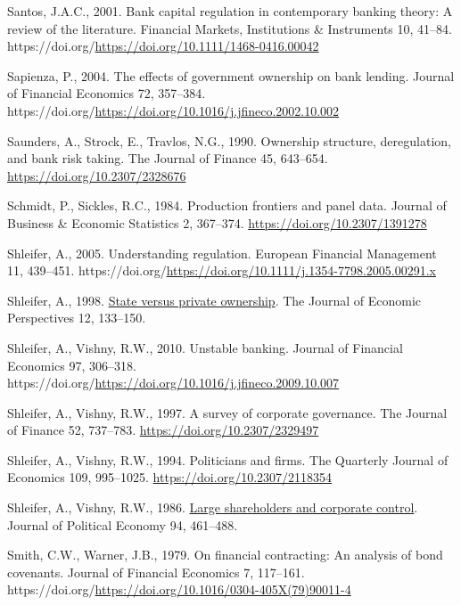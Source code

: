\documentclass[
  12pt,
  a4paper,
  DIV=11,
  numbers=noendperiod]{scrreprt}
\newlength{\cslhangindent}
\newenvironment{CSLReferences}[2] %
 {\begin{list}{}{%
  \setlength{\itemindent}{0pt}
  \setlength{\leftmargin}{0pt}
  \setlength{\parsep}{0pt}
  \ifodd #1
   \setlength{\leftmargin}{\cslhangindent}
   \setlength{\itemindent}{-1\cslhangindent}
  \fi
  \setlength{\itemsep}{#2\baselineskip}}}
 {\end{list}}
\begin{document}
\begin{CSLReferences}{1}{0}
Santos, J.A.C., 2001. Bank capital regulation in contemporary banking
theory: A review of the literature. Financial Markets, Institutions \&
Instruments 10, 41--84.
https://doi.org/\url{https://doi.org/10.1111/1468-0416.00042}

Sapienza, P., 2004. The effects of government ownership on bank lending.
Journal of Financial Economics 72, 357--384.
https://doi.org/\url{https://doi.org/10.1016/j.jfineco.2002.10.002}

Saunders, A., Strock, E., Travlos, N.G., 1990. Ownership structure,
deregulation, and bank risk taking. The Journal of Finance 45, 643--654.
\url{https://doi.org/10.2307/2328676}

Schmidt, P., Sickles, R.C., 1984. Production frontiers and panel data.
Journal of Business \& Economic Statistics 2, 367--374.
\url{https://doi.org/10.2307/1391278}

Shleifer, A., 2005. Understanding regulation. European Financial
Management 11, 439--451.
https://doi.org/\url{https://doi.org/10.1111/j.1354-7798.2005.00291.x}

Shleifer, A., 1998. \href{http://www.jstor.org/stable/2646898}{State
versus private ownership}. The Journal of Economic Perspectives 12,
133--150.

Shleifer, A., Vishny, R.W., 2010. Unstable banking. Journal of Financial
Economics 97, 306--318.
https://doi.org/\url{https://doi.org/10.1016/j.jfineco.2009.10.007}

Shleifer, A., Vishny, R.W., 1997. A survey of corporate governance. The
Journal of Finance 52, 737--783. \url{https://doi.org/10.2307/2329497}

Shleifer, A., Vishny, R.W., 1994. Politicians and firms. The Quarterly
Journal of Economics 109, 995--1025.
\url{https://doi.org/10.2307/2118354}

Shleifer, A., Vishny, R.W., 1986.
\href{http://www.jstor.org.queens.ezp1.qub.ac.uk/stable/1833044}{Large
shareholders and corporate control}. Journal of Political Economy 94,
461--488.

Smith, C.W., Warner, J.B., 1979. On financial contracting: An analysis
of bond covenants. Journal of Financial Economics 7, 117--161.
https://doi.org/\url{https://doi.org/10.1016/0304-405X(79)90011-4}


\end{CSLReferences}
\end{document}
